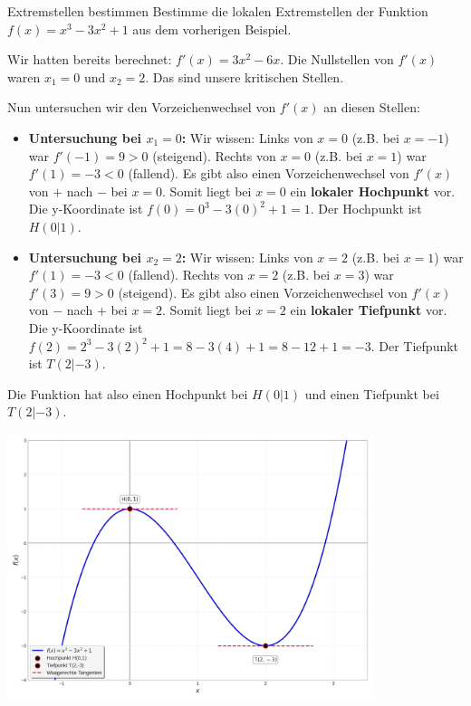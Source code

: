 \begin{beispielumgebung}{Extremstellen bestimmen}
Bestimme die lokalen Extremstellen der Funktion $f(x) = x^3 - 3x^2 + 1$ aus dem vorherigen Beispiel.

Wir hatten bereits berechnet:
$f'(x) = 3x^2 - 6x$.
Die Nullstellen von $f'(x)$ waren $x_1=0$ und $x_2=2$. Das sind unsere kritischen Stellen.

Nun untersuchen wir den Vorzeichenwechsel von $f'(x)$ an diesen Stellen:
\begin{itemize}
    \item \textbf{Untersuchung bei $x_1=0$:}
        Wir wissen:
        Links von $x=0$ (z.B. bei $x=-1$) war $f'(-1)=9 > 0$ (steigend).
        Rechts von $x=0$ (z.B. bei $x=1$) war $f'(1)=-3 < 0$ (fallend).
        Es gibt also einen Vorzeichenwechsel von $f'(x)$ von $+$ nach $-$ bei $x=0$.
        Somit liegt bei $x=0$ ein \textbf{lokaler Hochpunkt} vor.
        Die y-Koordinate ist $f(0) = 0^3 - 3(0)^2 + 1 = 1$.
        Der Hochpunkt ist $H(0|1)$.

    \item \textbf{Untersuchung bei $x_2=2$:}
        Wir wissen:
        Links von $x=2$ (z.B. bei $x=1$) war $f'(1)=-3 < 0$ (fallend).
        Rechts von $x=2$ (z.B. bei $x=3$) war $f'(3)=9 > 0$ (steigend).
        Es gibt also einen Vorzeichenwechsel von $f'(x)$ von $-$ nach $+$ bei $x=2$.
        Somit liegt bei $x=2$ ein \textbf{lokaler Tiefpunkt} vor.
        Die y-Koordinate ist $f(2) = 2^3 - 3(2)^2 + 1 = 8 - 3(4) + 1 = 8 - 12 + 1 = -3$.
        Der Tiefpunkt ist $T(2|-3)$.
\end{itemize}
Die Funktion hat also einen Hochpunkt bei $H(0|1)$ und einen Tiefpunkt bei $T(2|-3)$.
\begin{center}
    \includegraphics[width=0.8\textwidth]{grafiken/Differentialrechnung_Extrempunkte.png}
    \label{fig:extrempunkte_bsp}
\end{center}
\end{beispielumgebung}



